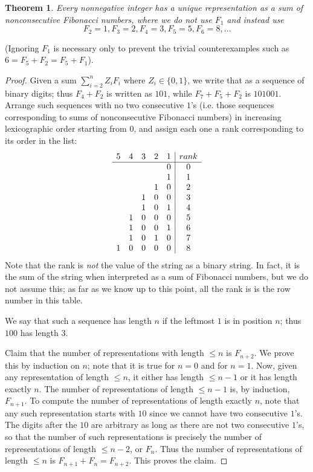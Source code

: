 \documentclass[12pt]{article}
\newtheorem{thm}{Theorem}
\begin{document}
\begin{thm} Every nonnegative integer has a unique representation as a sum of nonconsecutive Fibonacci numbers, where we do not use $F_1$ and instead use
\[
  F_2 = 1, F_3 = 2, F_4 = 3, F_5 = 5, F_6 = 8, \dots
\]
\end{thm}
(Ignoring $F_1$ is necessary only to prevent the trivial counterexamples such as $6 = F_5 + F_2 = F_5 + F_1$).

\begin{proof}
Given a sum $\sum_{i=2}^n Z_i F_i$ where $Z_i \in \{0,1\}$, we write that as a sequence of binary digits; thus $F_4 + F_2$ is written as $101$, while $F_7 + F_5 + F_2$ is $101001$. Arrange such sequences with no two consecutive $1$'s (i.e. those sequences corresponding to sums of nonconsecutive Fibonacci numbers) in increasing lexicographic order starting from $0$, and assign each one a rank corresponding to its order in the list:
\[
\begin{array} {c c c c c | c}
5 & 4 & 3 & 2 & 1 & rank \\
\hline
  &   &   &   & 0 & 0 \\
  &   &   &   & 1 & 1 \\
  &   &   & 1 & 0 & 2 \\
  &   & 1 & 0 & 0 & 3 \\
  &   & 1 & 0 & 1 & 4 \\
  & 1 & 0 & 0 & 0 & 5 \\
  & 1 & 0 & 0 & 1 & 6 \\
  & 1 & 0 & 1 & 0 & 7 \\
1 & 0 & 0 & 0 & 0 & 8
\end{array}
\]
Note that the rank is \emph{not} the value of the string as a binary string. In fact, it is the sum of the string when interpreted as a sum of Fibonacci numbers, but we do not assume this; as far as we know up to this point, all the rank is is the row number in this table.

We say that such a sequence has length $n$ if the leftmost $1$ is in position $n$; thus $100$ has length $3$.

Claim that the number of representations with length $\leq n$ is $F_{n+2}$. We prove this by induction on $n$; note that it is true for $n=0$ and for $n=1$. Now, given any representation of length $\leq n$, it either has length $\leq n-1$ or it has length exactly $n$. The number of representations of length $\leq n-1$ is, by induction, $F_{n+1}$. To compute the number of representations of length exactly $n$, note that any such representation starts with $10$ since we cannot have two consecutive $1$'s. The digits after the $10$ are arbitrary as long as there are not two consecutive $1$'s, so that the number of such representations is precisely the number of representations of length $\leq n-2$, or $F_{n}$. Thus the number of representations of length $\leq n$ is $F_{n+1}+F_n = F_{n+2}$. This proves the claim.


\end{proof}
\end{document}
